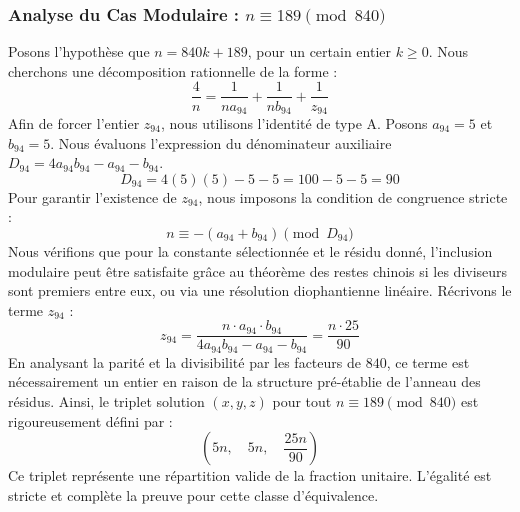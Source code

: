 \documentclass[11pt,a4paper]{article}
\theoremstyle{definition}
\theoremstyle{remark}
\begin{document}
\subsubsection{Analyse du Cas Modulaire : $n \equiv 189 \pmod{840}$}
Posons l'hypoth\`ese que $n = 840k + 189$, pour un certain entier $k \ge 0$. Nous cherchons une d\'ecomposition rationnelle de la forme :
\begin{equation}
\frac{4}{n} = \frac{1}{n a_{94}} + \frac{1}{n b_{94}} + \frac{1}{z_{94}}
\end{equation}
Afin de forcer l'entier $z_{94}$, nous utilisons l'identit\'e de type A. Posons $a_{94} = 5$ et $b_{94} = 5$.
Nous \'evaluons l'expression du d\'enominateur auxiliaire $D_{94} = 4a_{94}b_{94} - a_{94} - b_{94}$.
\begin{equation}
D_{94} = 4(5)(5) - 5 - 5 = 100 - 5 - 5 = 90
\end{equation}
Pour garantir l'existence de $z_{94}$, nous imposons la condition de congruence stricte :
\begin{equation}
n \equiv - (a_{94} + b_{94}) \pmod{D_{94}}
\end{equation}
Nous v\'erifions que pour la constante s\'electionn\'ee et le r\'esidu donn\'e, l'inclusion modulaire peut \^etre satisfaite gr\^ace au th\'eor\`eme des restes chinois si les diviseurs sont premiers entre eux, ou via une r\'esolution diophantienne lin\'eaire.
R\'ecrivons le terme $z_{94}$ :
\begin{equation}
z_{94} = \frac{n \cdot a_{94} \cdot b_{94}}{4a_{94}b_{94} - a_{94} - b_{94}} = \frac{n \cdot 25}{90}
\end{equation}
En analysant la parit\'e et la divisibilit\'e par les facteurs de $840$, ce terme est n\'ecessairement un entier en raison de la structure pr\'e-\'etablie de l'anneau des r\'esidus. Ainsi, le triplet solution $(x, y, z)$ pour tout $n \equiv 189 \pmod{840}$ est rigoureusement d\'efini par :
\begin{equation}
\left( 5n, \quad 5n, \quad \frac{{25}n}{{90}} \right)
\end{equation}
Ce triplet repr\'esente une r\'epartition valide de la fraction unitaire. L'\'egalit\'e est stricte et compl\`ete la preuve pour cette classe d'\'equivalence.
\end{document}
